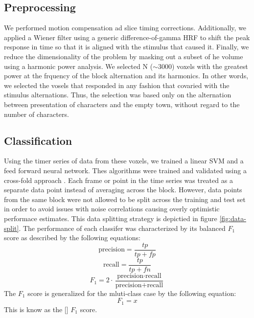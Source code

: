\documentclass[twocolumn,final]{article}
\begin{document}
\subsection{Preprocessing}
We performed motion compensation ad slice timing corrections. 
Additionally, we applied a Wiener filter using a generic difference-of-gamma HRF \cite{Boynton1996} to shift the peak response in time so that it is aligned with the stimulus that caused it.
Finally, we reduce the dimensionality of the problem by masking out a subset of he volume using a harmonic power analysis.
We selected N ($\sim$3000) voxels with the greatest power at the frquency of the block alternation and its harmonics.
In other words, we selected the vosels that responded in any fashion that covaried with the stimulus alternations.
Thus, the selection was based only on the alternation between presentation of characters and the empty town, without regard to the number of characters.

\subsection{Classification}
Using the timer series of data from these voxels, we trained a linear SVM and a feed forward neural network.
Thes algorithms were trained and validated using a cross-fold approach \cite{Kohavi1995}.
Each frame or point in the time series was treated as a separate data point instead of averaging across the block.
However, data points from the same block were not allowed to be split across the training and test set in order to avoid issues with noise correlations causing overly optimistic performace estimates.
This data splitting strategy is depictied in figure \ref{fig:data-split}.
The performance of each classifer was characterized by its balanced $F_1$ score as described by the following equations:
\begin{equation}
\mbox{precision} = \frac{tp}{tp + fp}
\label{eqn:precision}
\end{equation}
\begin{equation}
\mbox{recall} = \frac{tp}{tp + fn}
\label{eqn:recall}
\end{equation}
\begin{equation}
F_1 = 2 \cdot \frac{\mbox{precision} \cdot \mbox{recall}}{\mbox{precision} + \mbox{recall}}
\label{eqn:f1}
\end{equation}
The $F_1$ score is generalized for the mluti-class case by the following equation:
\begin{equation}
F_1 = x
\label{eqn:f1-multi}
\end{equation}
This is know as the  [] $F_1$ score.
\end{document}
